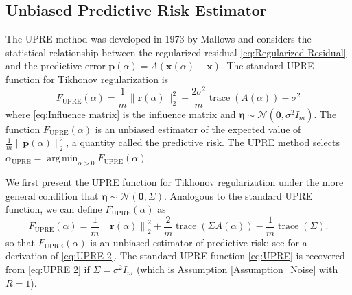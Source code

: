 \documentclass[12pt]{article}
\newcommand{\mA}{m}	%
\newcommand{\pVec}{\mathbf{p}}	%
\newcommand{\rVec}{\mathbf{r}}	%
\newcommand{\xVec}{\mathbf{x}}	%
\DeclareMathOperator{\trace}{trace}		%
\newcommand{\regparam}{\alpha}  %
\newcommand{\xReg}{\xVec(\regparam)}	%
\newcommand{\xSol}{\xVec}	%
\DeclareMathOperator*{\argmin}{arg\,min}
\newcommand{\noise}{\eta}	%
\newcommand{\noiseSD}{\sigma}	%
\newcommand{\noiseVec}{\bm{\noise}}	%
\newcommand{\zeroVec}{\bm{0}}	%
\newcommand{\A}{A(\regparam)}	%
\newcommand{\U}{F_{\text{UPRE}}}	%
\begin{document}

\subsection{Unbiased Predictive Risk Estimator} \label{sec:UPRE}
The UPRE method was developed in 1973 by Mallows and considers the statistical relationship between the regularized residual \eqref{eq:Regularized Residual} and the predictive error $\pVec(\regparam) = A(\xReg - \xSol)$. The standard UPRE function for Tikhonov regularization is
\begin{equation}
\label{eq:UPRE}
\U(\alpha) = \frac{1}{\mA}\|\rVec(\regparam)\|_2^2 + \frac{2\noiseSD^2}{\mA}\trace(\A) - \noiseSD^2
\end{equation}
where \eqref{eq:Influence matrix} is the influence matrix and $\noiseVec \sim \mathcal{N}(\bm{0},\noiseSD^2 I_{\mA})$. The function $\U(\regparam)$ is an unbiased estimator of the expected value of $\frac{1}{\mA}\|\pVec(\regparam)\|_2^2$, a quantity called the predictive risk. The UPRE method selects $\regparam_{\textrm{UPRE}} = \argmin_{\regparam > 0} \U(\regparam)$. \par
We first present the UPRE function for Tikhonov regularization under the more general condition that $\noiseVec \sim \mathcal{N}(\bm{0},\Sigma)$. Analogous to the standard UPRE function, we can define $\U(\regparam)$ as
\begin{equation}
\label{eq:UPRE 2}
\U(\regparam) = \frac{1}{\mA}\left\|\rVec(\regparam)\right\|_2^2 + \frac{2}{\mA}\trace\left(\Sigma\A\right) - \frac{1}{\mA}\trace\left(\Sigma\right).
\end{equation}
so that $\U(\regparam)$ is an unbiased estimator of predictive risk; see \cite{Byrne} for a derivation of \eqref{eq:UPRE 2}. The standard UPRE function \eqref{eq:UPRE} is recovered from \eqref{eq:UPRE 2} if $\Sigma = \noiseSD^2 I_{\mA}$ (which is Assumption \ref{Assumption_Noise} with $R = 1$).
\end{document}
